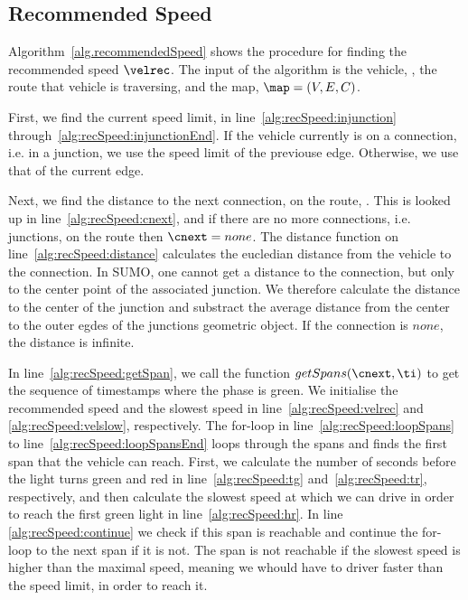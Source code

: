 \subsection{Recommended Speed}
Algorithm~\ref{alg.recommendedSpeed} shows the procedure for finding the recommended speed $\velrec$.
The input of the algorithm is the vehicle, \veh, the route that vehicle is traversing, \route and the map, $\map = (V, E, C)$.

First, we find the current speed limit, \velmax in line~\ref{alg:recSpeed:injunction} through~\ref{alg:recSpeed:injunctionEnd}. %
If the vehicle currently is on a connection, i.e. in a junction, we use the speed limit of the previouse edge.
Otherwise, we use that of the current edge.

Next, we find the distance to the next connection, \cnext on the route, \route. 
This is looked up in line~\ref{alg:recSpeed:cnext}, and if there are no more connections, i.e. junctions, on the route then $\cnext=none$.
The distance function on line~\ref{alg:recSpeed:distance} calculates the eucledian distance from the vehicle to the connection.
In SUMO, one cannot get a distance to the connection, but only to the center point of the associated junction.
We therefore calculate the distance to the center of the junction and substract the average distance from the center to the outer egdes of the junctions geometric object. %
If the connection is $none$, the distance is infinite.

In line~\ref{alg:recSpeed:getSpan}, we call the function $getSpans(\cnext, \ti)$ to get the sequence of timestamps where the phase is green.
We initialise the recommended speed and the slowest speed in line~\ref{alg:recSpeed:velrec} and \ref{alg:recSpeed:velslow}, respectively.
The for-loop in line~\ref{alg:recSpeed:loopSpans} to line~\ref{alg:recSpeed:loopSpansEnd} loops through the spans and finds the first span that the vehicle can reach.
First, we calculate the number of seconds before the light turns green and red in line~\ref{alg:recSpeed:tg} and~\ref{alg:recSpeed:tr}, respectively, and then calculate the slowest speed at which we can drive in order to reach the first green light in line~\ref{alg:recSpeed:hr}.
In line \ref{alg:recSpeed:continue} we check if this span is reachable and continue the for-loop to the next span if it is not. 
The span is not reachable if the slowest speed is higher than the maximal speed, meaning we whould have to driver faster than the speed limit, in order to reach it.

